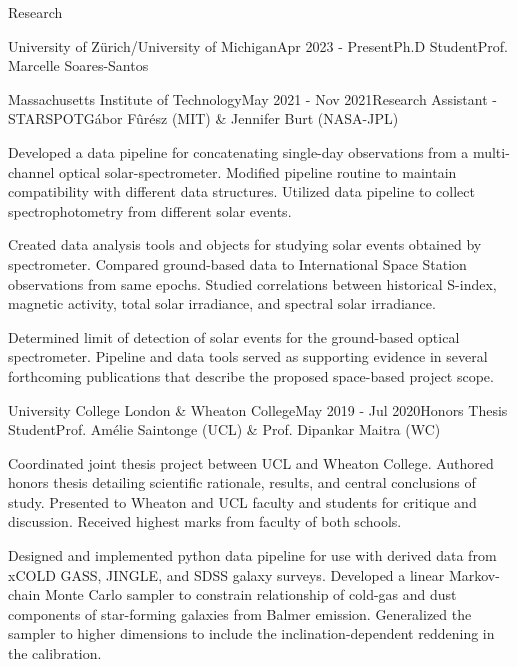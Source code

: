 \documentclass{resume} %
\begin{document}
\begin{rSection}{Research}
\begin{rSubsection}{University of Zürich/University of Michigan}{Apr 2023 - Present}{Ph.D Student}{Prof. Marcelle Soares-Santos}
\begin{rSubsection}{Massachusetts Institute of Technology}{May 2021 - Nov 2021}{Research Assistant - STARSPOT}{G\'abor F\^ur\'esz (MIT) \& Jennifer Burt (NASA-JPL)}
\item Developed a data pipeline for concatenating single-day observations from a multi-channel optical solar-spectrometer. Modified pipeline routine to maintain compatibility with different data structures. Utilized data pipeline to collect spectrophotometry from different solar events.
\item Created data analysis tools and objects for studying solar events obtained by spectrometer. Compared ground-based data to International Space Station observations from same epochs. Studied correlations between historical S-index, magnetic activity, total solar irradiance, and spectral solar irradiance.
\item Determined limit of detection of solar events for the ground-based optical spectrometer. Pipeline and data tools served as supporting evidence in several forthcoming publications that describe the proposed space-based project scope.
\end{rSubsection}

\newpage

\begin{rSubsection}{University College London \& Wheaton College}{May 2019 - Jul 2020}{Honors Thesis Student}{Prof. Am\'{e}lie Saintonge (UCL) \& Prof. Dipankar Maitra (WC)}
\item Coordinated joint thesis project between UCL and Wheaton College. Authored honors thesis detailing scientific rationale, results, and central conclusions of study. Presented to Wheaton and UCL faculty and students for critique and discussion. Received highest marks from faculty of both schools.
\item Designed and implemented python data pipeline for use with derived data from xCOLD GASS, JINGLE, and SDSS galaxy surveys. Developed a linear Markov-chain Monte Carlo sampler to constrain relationship of cold-gas and dust components of star-forming galaxies from Balmer emission. Generalized the sampler to higher dimensions to include the inclination-dependent reddening in the calibration.
\end{rSubsection}



\end{rSubsection}
\end{rSection}
\end{document}
